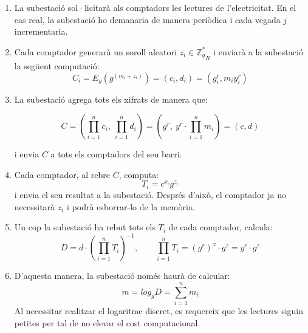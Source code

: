 \begin{enumerate}
	\item La subestació sol·licitarà als comptadors les lectures de l'electricitat. En el cas real, la subestació ho demanaria de manera periòdica i cada vegada $j$ incrementaria.
	\item Cada comptador generarà un soroll aleatori $z_i \in {\mathbb{Z}_{q}^*}_R$ i enviarà a la subestació la següent computació: 
	\[C_i = E_y(g^{(m_i + z_i)}) = (c_i, d_i) = (g^r_i, m_i y^r_i)\]
	\item La subestació agrega tots els xifrats de manera que:
	
	\[C = (\prod_{i=1}^{n} c_i, \ \prod_{i=1}^{n} d_i) = (g^r, \ y^r \cdot \prod_{i=1}^{n} m_i) = (c, d)\]
	
	i envia $C$ a tots els comptadors del seu barri.\label{en:busom-s1}
	\item Cada comptador, al rebre $C$, computa:
	\[T_i = c^{x_i} g^{z_i}\]
	i envia el seu resultat a la subestació. Després d'això, el comptador ja no necessitarà $z_i$ i podrà esborrar-lo de la memòria.\label{en:busom-m1}
	\item Un cop la subestació ha rebut tots els $T_i$ de cada comptador, calcula:
	\[D = d \cdot (\prod_{i=1}^{n} T_i)^{-1}, \qquad \prod_{i=1}^{n} T_i = (g^{r})^x \cdot g^z = y^r \cdot g^z\]
	\item D'aquesta manera, la subestació només haurà de calcular:
	\[m = log_g D = \sum_{i=1}^{n} m_i\]
	Al necessitar realitzar el logaritme discret, es requereix que les lectures siguin petites per tal de no elevar el cost computacional.
\end{enumerate}
